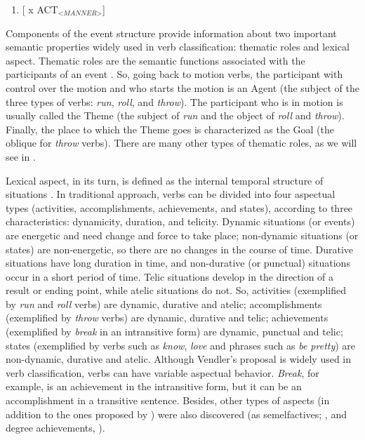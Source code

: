 \documentclass[english]{textolivre}
\begin{document}
\begin{enumerate}[label=(\arabic*),resume]
\item \label{itm12}[ x ACT$_{\textit{<MANNER>}}$] \\
\cite[p.~108]{butt_building_1998}
\end{enumerate}
    
Components of the event structure provide information about two important semantic properties widely used in verb classification: thematic roles and lexical aspect. Thematic roles are the semantic functions associated with the participants of an event \cite{bach__1968,jackendoff_semantic_1990,dowty_thematic_1991}. So, going back to motion verbs, the participant with control over the motion and who starts the motion is an Agent (the subject of the three types of verbs: \textit{run}, \textit{roll}, and \textit{throw}). The participant who is in motion is usually called the Theme (the subject of \textit{run} and the object of \textit{roll} and \textit{throw}). Finally, the place to which the Theme goes is characterized as the Goal (the oblique for \textit{throw} verbs). There are many other types of thematic roles, as we will see in .

Lexical aspect, in its turn, is defined as the internal temporal structure of situations \cite{vendler_linguistics_1967,dowty_word_1979,valin_jr._exploring_2005,rothstein_structuring_2004}. In  traditional approach, verbs can be divided into four aspectual types (activities, accomplishments, achievements, and states), according to three characteristics: dynamicity, duration, and telicity. Dynamic situations (or events) are energetic and need change and force to take place; non-dynamic situations (or states) are non-energetic, so there are no changes in the course of time. Durative situations have long duration in time, and non-durative (or punctual) situations occur in a short period of time. Telic situations develop in the direction of a result or ending point, while atelic situations do not. So, activities (exemplified by \textit{run} and \textit{roll} verbs) are dynamic, durative and atelic; accomplishments (exemplified by \textit{throw} verbs) are dynamic, durative and telic; achievements (exemplified by \textit{break} in an intransitive form) are dynamic, punctual and telic; states (exemplified by verbs such as \textit{know}, \textit{love} and phrases such as \textit{be pretty}) are non-dynamic, durative and atelic. Although Vendler’s proposal is widely used in verb classification, verbs can have variable aspectual behavior. \textit{Break}, for example, is an achievement in the intransitive form, but it can be an accomplishment in a transitive sentence. Besides, other types of aspects (in addition to the ones proposed by \textcite{vendler_linguistics_1967}) were also discovered (as semelfactives; \textcite{smith_parameter_1991}, and degree achievements, \textcite{dowty_thematic_1991}).
\end{document}
